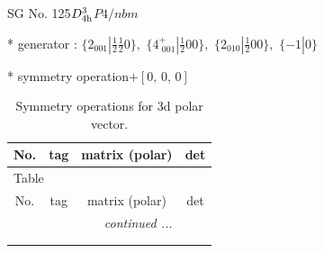 \documentclass[fleqn,8pt]{jsarticle}
\begin{document}
\setcounter{MaxMatrixCols}{32}

\renewcommand{\tablename}{Table~}
\renewcommand{\figurename}{Figure~}
\begin{center}
\LARGE
SG No. 125\quad$D_{\rm 4h}^{3}$\quad$P4/nbm$\quad[ tetragonal ]
\end{center}

* generator : $\{2{}_{001}|\frac{1}{2} \frac{1}{2} 0\},\,\,\{4^{+}_{\,\,001}|\frac{1}{2} 0 0\},\,\,\{2{}_{010}|\frac{1}{2} 0 0\},\,\,\{-1|0\}$

* symmetry operation\quad$+\left[ 0,\, 0,\, 0 \right]$
\renewcommand{\arraystretch}{1.3}
\begin{longtable}{cccc}
\caption{Symmetry operations for 3d polar vector.}
 \\
 \hline \hline
No. & tag & matrix (polar) & det \\ \hline \endfirsthead

\multicolumn{3}{l}{\tablename\ \thetable{}} \\
 \hline \hline
No. & tag & matrix (polar) & det \\ \hline \endhead

 \hline \hline
\multicolumn{3}{r}{\footnotesize\it continued ...} \\ \endfoot

 \hline \hline
\multicolumn{3}{r}{} \\ \endlastfoot


\end{longtable}
\end{document}

